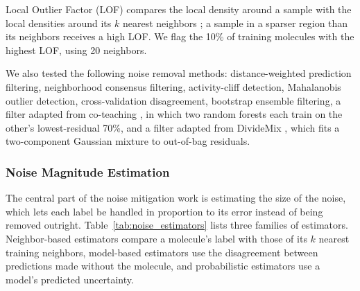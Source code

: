Local Outlier Factor (LOF) compares the local density around a sample with the local densities around its $k$ nearest neighbors \citep{Breunig2000}; a sample in a sparser region than its neighbors receives a high LOF. We flag the 10\% of training molecules with the highest LOF, using 20 neighbors. %

We also tested the following noise removal methods: distance-weighted prediction filtering, neighborhood consensus filtering, activity-cliff detection, Mahalanobis outlier detection, cross-validation disagreement, bootstrap ensemble filtering, a filter adapted from co-teaching \citep{Han2018}, in which two random forests each train on the other's lowest-residual 70\%, and a filter adapted from DivideMix \citep{li2020dividemix}, which fits a two-component Gaussian mixture to out-of-bag residuals.

\subsubsection{Noise Magnitude Estimation}

The central part of the noise mitigation work is estimating the size of the noise, which lets each label be handled in proportion to its error instead of being removed outright. Table~\ref{tab:noise_estimators} lists three families of estimators. Neighbor-based estimators compare a molecule's label with those of its $k$ nearest training neighbors, model-based estimators use the disagreement between predictions made without the molecule, and probabilistic estimators use a model's predicted uncertainty.

